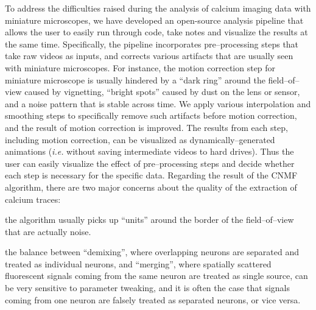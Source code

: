 \documentclass[master.tex]{subfiles}
\begin{document}
To address the difficulties raised during the analysis of calcium imaging data
with miniature microscopes, we have developed an open-source analysis pipeline
that allows the user to easily run through code, take notes and visualize the
results at the same time. Specifically, the pipeline incorporates
pre--processing steps that take raw videos as inputs, and corrects various
artifacts that are usually seen with miniature microscopes. For instance, the
motion correction step for miniature microscope is usually hindered by a ``dark
ring'' around the field--of--view caused by vignetting, ``bright spots'' caused
by dust on the lens or sensor, and a noise pattern that is stable across time.
We apply various interpolation and smoothing steps to specifically remove such
artifacts before motion correction, and the result of motion correction is
improved. The results from each step, including motion correction, can be
visualized as dynamically--generated animations (\textit{i.e.} without saving
intermediate videos to hard drives). Thus the user can easily visualize the
effect of pre--processing steps and decide whether each step is necessary for
the specific data. Regarding the result of the CNMF algorithm, there are two
major concerns about the quality of the extraction of calcium traces:
\begin{inparaenum}[a)]
\item the algorithm usually picks up ``units'' around the border of the
  field--of--view that are actually noise.
\item the balance between ``demixing'', where overlapping neurons are separated
  and treated as individual neurons, and ``merging'', where spatially scattered
  fluorescent signals coming from the same neuron are treated as single source,
  can be very sensitive to parameter tweaking, and it is often the case that
  signals coming from one neuron are falsely treated as separated neurons, or
  vice versa.
\end{inparaenum}
\end{document}
